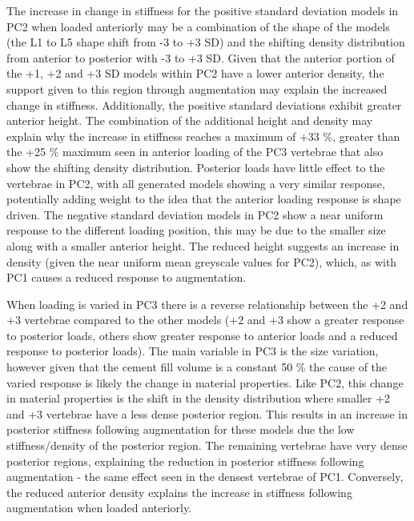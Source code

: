 The increase in change in stiffness for the positive standard deviation models
in PC2 when loaded anteriorly may be a combination of the shape of the models
(the L1 to L5 shape shift from -3 to +3 SD) and the shifting density
distribution from anterior to posterior with -3 to +3 SD.  Given that the
anterior portion of the +1, +2 and +3 SD models within PC2 have a lower
anterior density, the support given to this region through augmentation may
explain the increased change in stiffness.  Additionally, the positive standard
deviations exhibit greater anterior height.  The combination of the additional
height and density may explain why the increase in stiffness reaches a maximum
of +33 \%, greater than the +25 \% maximum seen in anterior loading of the PC3
vertebrae that also show the shifting density distribution.  Posterior loads
have little effect to the vertebrae in PC2, with all generated models showing a
very similar response, potentially adding weight to the idea that the anterior
loading response is shape driven.  The negative standard deviation models in
PC2 show a near uniform response to the different loading position, this may be
due to the smaller size along with a smaller anterior height.  The reduced
height suggests an increase in density (given the near uniform mean greyscale
values for PC2), which, as with PC1 causes a reduced response to augmentation.

When loading is varied in PC3 there is a reverse relationship between the +2
and +3 vertebrae compared to the other models (+2 and +3 show a greater
response to posterior loads, others show greater response to anterior loads and
a reduced response to posterior loads). The main variable in PC3 is the size
variation, however given that the cement fill volume is a constant 50 \% the
cause of the varied response is likely the change in material properties. Like
PC2, this change in material properties is the shift in the density
distribution where smaller +2 and +3 vertebrae have a less dense posterior
region. This results in an increase in posterior stiffness following
augmentation for these models due the low stiffness/density of the posterior
region. The remaining vertebrae have very dense posterior regions, explaining
the reduction in posterior stiffness following augmentation - the same effect
seen in the densest vertebrae of PC1. Conversely, the reduced anterior density
explains the increase in stiffness following augmentation when loaded
anteriorly.



